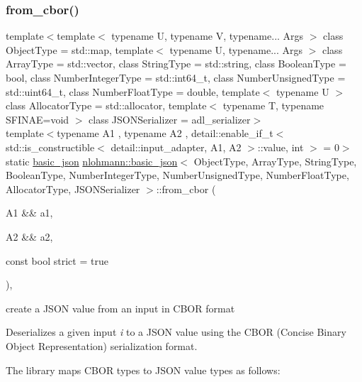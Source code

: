 \subsubsection{\texorpdfstring{from\+\_\+cbor()}{from\_cbor()}\hspace{0.1cm}{\footnotesize\ttfamily [2/2]}}
{\footnotesize\ttfamily template$<$template$<$ typename U, typename V, typename... Args $>$ class Object\+Type = std\+::map, template$<$ typename U, typename... Args $>$ class Array\+Type = std\+::vector, class String\+Type  = std\+::string, class Boolean\+Type  = bool, class Number\+Integer\+Type  = std\+::int64\+\_\+t, class Number\+Unsigned\+Type  = std\+::uint64\+\_\+t, class Number\+Float\+Type  = double, template$<$ typename U $>$ class Allocator\+Type = std\+::allocator, template$<$ typename T, typename S\+F\+I\+N\+A\+E=void $>$ class J\+S\+O\+N\+Serializer = adl\+\_\+serializer$>$ \\
template$<$typename A1 , typename A2 , detail\+::enable\+\_\+if\+\_\+t$<$ std\+::is\+\_\+constructible$<$ detail\+::input\+\_\+adapter, A1, A2 $>$\+::value, int $>$  = 0$>$ \\
static \mbox{\hyperlink{classnlohmann_1_1basic__json}{basic\+\_\+json}} \mbox{\hyperlink{classnlohmann_1_1basic__json}{nlohmann\+::basic\+\_\+json}}$<$ Object\+Type, Array\+Type, String\+Type, Boolean\+Type, Number\+Integer\+Type, Number\+Unsigned\+Type, Number\+Float\+Type, Allocator\+Type, J\+S\+O\+N\+Serializer $>$\+::from\+\_\+cbor (\begin{DoxyParamCaption}\item[{A1 \&\&}]{a1,  }\item[{A2 \&\&}]{a2,  }\item[{const bool}]{strict = {\ttfamily true} }\end{DoxyParamCaption})\hspace{0.3cm}{\ttfamily [inline]}, {\ttfamily [static]}}



create a J\+S\+ON value from an input in C\+B\+OR format 

Deserializes a given input {\itshape i} to a J\+S\+ON value using the C\+B\+OR (Concise Binary Object Representation) serialization format.

The library maps C\+B\+OR types to J\+S\+ON value types as follows\+:

